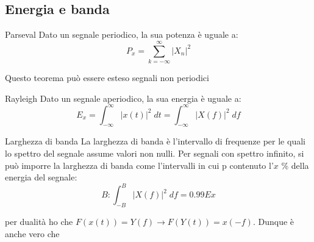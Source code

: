 \subsection{Energia e banda}
\begin{teorema}{Parseval}
	Dato un segnale periodico, la sua potenza è uguale a:
	\[
		P_x = \sum_{k=-\infty }^{\infty} \left|X_n\right|^2
	\]
\end{teorema}
Questo teorema può essere esteso segnali non periodici
\begin{teorema}{Rayleigh}
	Dato un segnale aperiodico, la sua energia è uguale a:
	\[
		E_x = \int_{-\infty }^{\infty } \left|x\left(t\right)\right|^2  \; dt = \int_{-\infty }^{\infty } \left|X\left(f\right)\right|^2 \; df
	\]
\end{teorema}
\begin{definizione}{Larghezza di banda}
	La larghezza di banda è l'intervallo di frequenze per le quali lo spettro del segnale assume valori non nulli. Per segnali con spettro infinito, si può imporre la larghezza di banda come l'intervalli in cui p contenuto l'$ x $ \% della energia del segnale:
	\[
		B: \int_{-B}^{B} \left|X\left(f\right)\right|^2  \; df = 0.99Ex
	\]
\end{definizione}

per dualità ho che $ F\left(x\left(t\right)\right) = Y\left(f\right) \rightarrow F\left(Y\left(t\right)\right)= x\left(-f\right) $. Dunque è anche vero che
\newpage
